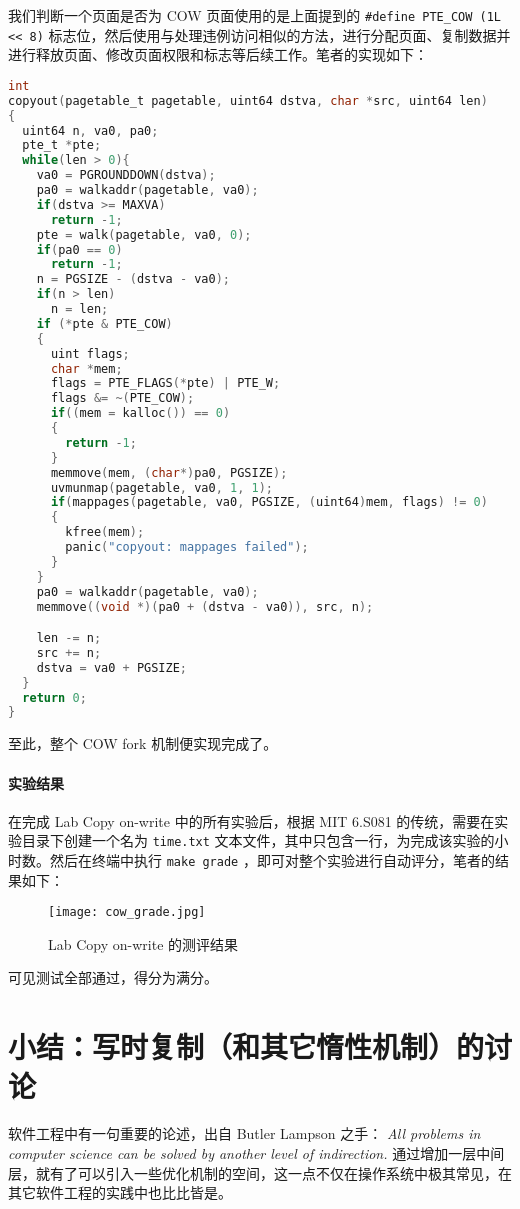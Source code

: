 我们判断一个页面是否为 COW 页面使用的是上面提到的 \lstinline{#define PTE_COW (1L << 8)} 标志位，然后使用与处理违例访问相似的方法，进行分配页面、复制数据并进行释放页面、修改页面权限和标志等后续工作。笔者的实现如下：
\begin{lstlisting}[language=C]
int
copyout(pagetable_t pagetable, uint64 dstva, char *src, uint64 len)
{
  uint64 n, va0, pa0;
  pte_t *pte;
  while(len > 0){
    va0 = PGROUNDDOWN(dstva);
    pa0 = walkaddr(pagetable, va0);
    if(dstva >= MAXVA)
      return -1;
    pte = walk(pagetable, va0, 0);
    if(pa0 == 0)
      return -1;
    n = PGSIZE - (dstva - va0);
    if(n > len)
      n = len;
    if (*pte & PTE_COW)
    {
      uint flags;
      char *mem;
      flags = PTE_FLAGS(*pte) | PTE_W;
      flags &= ~(PTE_COW);
      if((mem = kalloc()) == 0)
      {
        return -1;
      }
      memmove(mem, (char*)pa0, PGSIZE);
      uvmunmap(pagetable, va0, 1, 1);
      if(mappages(pagetable, va0, PGSIZE, (uint64)mem, flags) != 0)
      {
        kfree(mem);
        panic("copyout: mappages failed");
      }
    }
    pa0 = walkaddr(pagetable, va0);
    memmove((void *)(pa0 + (dstva - va0)), src, n);

    len -= n;
    src += n;
    dstva = va0 + PGSIZE;
  }
  return 0;
}
\end{lstlisting}

至此，整个 COW fork 机制便实现完成了。

\paragraph*{实验结果} 在完成 Lab Copy on-write 中的所有实验后，根据 MIT 6.S081 的传统，需要在实验目录下创建一个名为 \lstinline{time.txt} 文本文件，其中只包含一行，为完成该实验的小时数。然后在终端中执行 \lstinline{make grade} ，即可对整个实验进行自动评分，笔者的结果如下：
\begin{figure}[H]
  \centering
  \texttt{[image: cow\_grade.jpg]}
  \caption{ Lab Copy on-write 的测评结果}
\end{figure}
可见测试全部通过，得分为满分。


\section{小结：写时复制（和其它惰性机制）的讨论}

软件工程中有一句重要的论述，出自 Butler Lampson 之手： \textit{All problems in computer science can be solved by another level of indirection.} 通过增加一层中间层，就有了可以引入一些优化机制的空间，这一点不仅在操作系统中极其常见，在其它软件工程的实践中也比比皆是。

